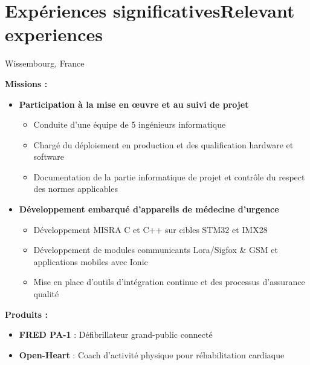 \section{\ifnativelang Exp\'eriences significatives\else Relevant experiences\fi}

{}{}{Wissembourg, France}{
\ifnativelang
	\textcolor{color1}{\textbf{Missions :}}
	\begin{itemize}
		\item \textbf{Participation \`a la mise en \oe uvre et au suivi de projet}
		\begin{itemize}
			\item Conduite d’une équipe de 5 ingénieurs informatique
			\item Chargé du déploiement en production et des qualification hardware et software
			\item Documentation de la partie informatique de projet et contrôle du respect des normes applicables
		\end{itemize}
		\item \textbf{Développement embarqué d'appareils de médecine d’urgence}
		\begin{itemize}
			\item D\'eveloppement MISRA C et C++ sur cibles STM32 et IMX28
			\item D\'eveloppement de modules communicants Lora/Sigfox \& GSM et applications mobiles avec Ionic
			\item Mise en place d'outils d'intégration continue et des processus d'assurance qualit\'e
		\end{itemize}
	\end{itemize}
	\textcolor{color1}{\textbf{Produits :}}
	\begin{itemize}
		\item \textbf{FRED PA-1} : Défibrillateur grand-public connecté \textcolor{color1}{\href{http://www.schiller.ch/fr/fr/product/fred-pa-1}{\ExternalLink}}
		\item \textbf{Open-Heart} : Coach d'activit\'e physique pour r\'ehabilitation cardiaque \textcolor{color1}{\href{http://www.schiller.ch/fr/fr/schiller-\%C3\%A0-la-fine-pointe-de-la-sant\%C3\%A9-connect\%C3\%A9e}{\ExternalLink}}

\end{itemize}}
